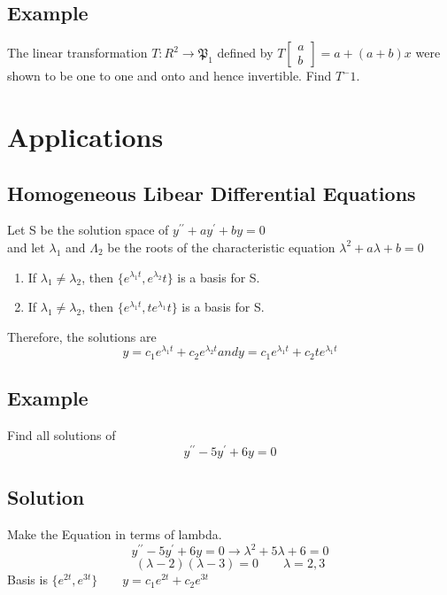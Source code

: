 \subsection*{Example}
The linear transformation $T: R^2 \rightarrow \mathfrak{P}_1$ defined by $T\begin{bmatrix}
    a\\b
\end{bmatrix} = a+ (a+b)x$ were shown to be one to one and onto and hence invertible. Find $T^-1$.

\section{Applications}
\subsection*{Homogeneous Libear Differential Equations}
Let S be the solution space of $y^{\prime\prime} + ay^\prime + by = 0$\\
and let $\lambda_1$ and $\Lambda_2$ be the roots of the characteristic equation $\lambda^2 + a\lambda + b = 0$
\begin{enumerate}[a]
    \item If $\lambda_1\neq\lambda_2$, then $\{e^{\lambda_1t}, e^{\lambda_2}t\}$ is a basis for S. 
    \item If $\lambda_1\neq\lambda_2$, then $\{e^{\lambda_1t}, te^{\lambda_1}t\}$ is a basis for S.
\end{enumerate}
Therefore, the solutions are $$y = c_1e^{\lambda_1t} + c_2e^{\lambda_2t} and y = c_1e^{\lambda_1t} + c_2te^{\lambda_1t}$$
\subsection*{Example}
Find all solutions of $$y^{\prime\prime} - 5y^\prime + 6y = 0$$
\subsection*{Solution}
Make the Equation in terms of lambda.
$$y^{\prime\prime} - 5y^\prime + 6y = 0\rightarrow\lambda^2 + 5\lambda + 6 = 0$$
$$(\lambda - 2)(\lambda - 3)= 0\qquad \lambda = 2,3$$
Basis is $\{e^{2t}, e^{3t}\}\qquad y = c_1e^{2t} + c_2e^{3t}$